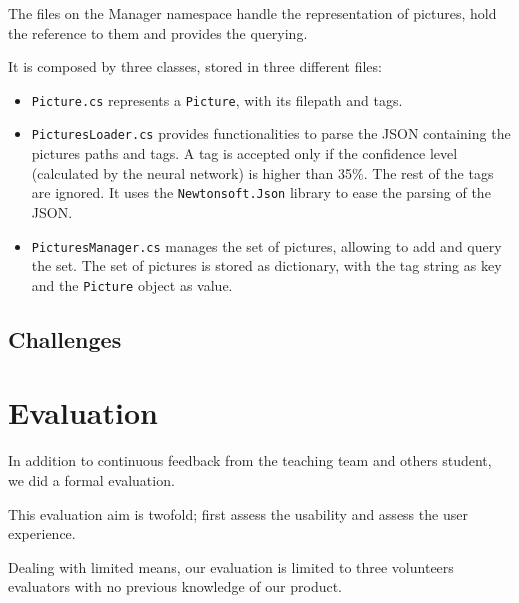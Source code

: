 \documentclass[11pt,a4paper]{article}
\begin{document}
The files on the Manager namespace handle the representation of pictures, hold the reference to them and provides the querying.

It is composed by three classes, stored in three different files:
\begin{itemize}
\item \texttt{Picture.cs} represents a \texttt{Picture}, with its filepath and tags.
\item \texttt{PicturesLoader.cs} provides functionalities to parse the JSON containing the pictures paths and tags. 
A tag is accepted only if the confidence level (calculated by the neural network) is higher than 35$\%$.
The rest of the tags are ignored.
It uses the \texttt{Newtonsoft.Json} library to ease the parsing of the JSON.
\item \texttt{PicturesManager.cs} manages the set of pictures, allowing to add and query the set. The set of pictures is stored as dictionary, with the tag string as key and the \texttt{Picture} object as value.
\end{itemize}
\subsection{Challenges}







\section{Evaluation} \label{eval}

In addition to continuous feedback from the teaching team and others student, we did a formal evaluation.

This evaluation aim is twofold; first assess the usability and assess the user experience.

Dealing with limited means, our evaluation is limited to three volunteers evaluators with no previous knowledge of our product.


\end{document}

